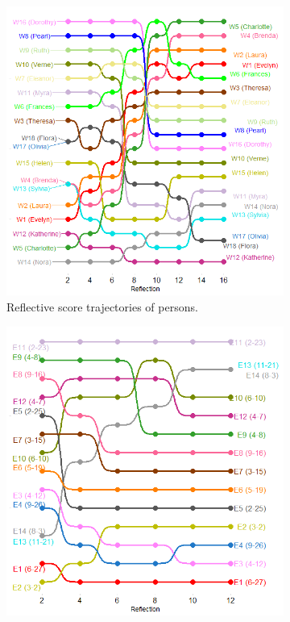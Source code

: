\documentclass[a4paper,fleqn]{cas-sc}
\begin{document}
\begin{figure}[ht!]
    \captionsetup[subfigure]{font=footnotesize,labelfont=footnotesize}
    \centering
     \begin{subfigure}[b]{0.45\textwidth}
        \includegraphics[width=1.0\textwidth]{Plots/p-reflections.png}
            \caption{Reflective score trajectories of persons.}
            \label{fig:p-refs}
    \end{subfigure}
     \begin{subfigure}[b]{0.45\textwidth}
        \includegraphics[width=1.0\textwidth]{Plots/g-reflections.png}

\end{subfigure}
\end{figure}
\end{document}
